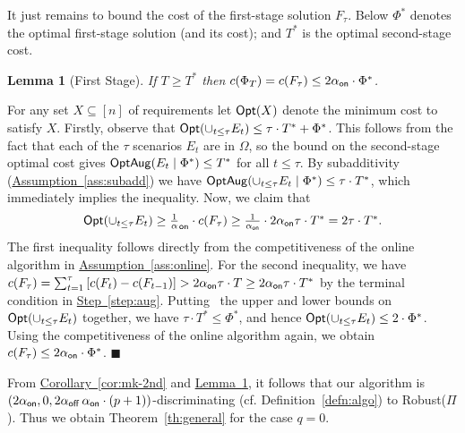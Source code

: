 \documentclass[11pt,letterpaper]{article}
\newcommand{\ignore}[1]{}
\newcommand{\lref}[2][]{\hyperref[#2]{#1~\ref*{#2}}}
\newtheorem{lemma}[theorem]{Lemma}
\newenvironment{proof}{

\noindent{\bf Proof:}} {\hfill$\blacksquare$


}
\def\opt{{\sf Opt}\xspace}
\def\cov{\ensuremath{\Pi}\xspace}
\def\rcov{{\sf Robust(\cov)}\xspace}
\def\fst{\ensuremath {\Phi_T}\xspace}
\newcommand{\sse}{\subseteq}
\newcommand{\ts}{\textstyle}
\newcommand{\offline}{\alpha_{\sf off}}
\newcommand{\online}{\alpha_{\sf on}}
\newcommand{\optaug}{{\sf OptAug}}
\newcounter{note}[section]
\newcommand{\Tstar}{\ensuremath{T^*}\xspace}
\newcommand{\Phistar}{\ensuremath{\Phi^*}\xspace}
\begin{document}
It just remains to bound the cost of the first-stage solution $F_{\tau}$. Below $\Phistar$ denotes the optimal
first-stage solution (and its cost); and $\Tstar$ is the optimal second-stage cost.
\begin{lemma}[First Stage]\label{lem:mk-1st}
If $T\ge \Tstar$ then $c(\fst)=c(F_\tau) \leq  2\online\cdot\Phistar$.
\end{lemma}
\begin{proof}
For any set $X\sse[n]$ of requirements let $\opt(X)$ denote the minimum cost to satisfy $X$. Firstly, observe that
$\opt(\cup_{t\le \tau} E_t)\le \tau\cdot \Tstar+\Phistar$.
This follows from the fact that each of the $\tau$ scenarios $E_t$ are
  in $\Omega$, so the bound on the second-stage optimal cost gives
  $\optaug(E_t\mid \Phistar)\le \Tstar$ for all $t\le \tau$. By
  subadditivity (\lref[Assumption]{ass:subadd}) we have
  $\optaug(\cup_{t\le \tau} E_t\mid \Phistar)\le \tau\cdot \Tstar$,
  which immediately implies the inequality. Now, we claim that
  \begin{equation}
    \label{mk:eq2}
    \ts \opt(\cup_{t\le \tau} E_t)\ge \frac1\online \cdot c(F_\tau) \geq
    \frac{1}{\online} \cdot 2\online\tau\cdot \Tstar = 2\tau\cdot \Tstar.
  \end{equation}
  The first inequality follows directly from the competitiveness of the
  online algorithm in \lref[Assumption]{ass:online}. For the second
  inequality, we have $c(F_\tau)= \sum_{t=1}^\tau \left[ c(F_t)-
    c(F_{t-1})\right] > 2\online\tau\cdot T\ge 2\online\tau\cdot \Tstar$ by the terminal
  condition in \lref[Step]{step:aug}.  Putting~ the upper and lower bounds on
 $\opt(\cup_{t\le \tau} E_t)$ together, we have $\tau\cdot \Tstar\le \Phistar$,
  and hence $\opt(\cup_{t\le \tau} E_t)\le 2\cdot
 \Phistar$. Using the competitiveness of the online
  algorithm again, we obtain  $c(F_\tau)\le 2\online\cdot \Phistar$.
\end{proof}

From \lref[Corollary]{cor:mk-2nd} and \lref[Lemma]{lem:mk-1st}, it follows that our algorithm is $\left(2\online, 0,
2\offline\,\online\cdot (p+1) \right)$-discriminating (cf. Definition~\ref{defn:algo}) to \rcov. Thus we obtain
Theorem~\ref{th:general} for the case $q=0$.

\ignore{outputs a solution of objective value at most $2\online\cdot \Phistar + 2\offline\online(p+2)\cdot
\lambda\Tstar$, where the second stage augmentation algorithm is just the offline approximation from
\lref[Property]{ass:apx}. This completes the proof of \lref[Theorem]{th:general} for the case of just matroid
constraints (i.e. $p = 0$). In \lref[Subsection]{sec:knapsack-mat}, we show how knapsack constraints can be reduced to
partition matroids, so as to obtain \lref[Theorem]{th:general}.}
\end{document}
